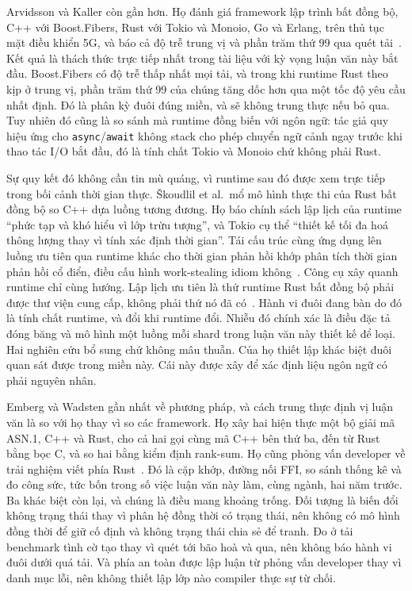 Arvidsson và Kaller còn gần hơn. Họ đánh giá framework lập trình bất đồng bộ, C++
với Boost.Fibers, Rust với Tokio và Monoio, Go và Erlang, trên thủ tục mặt điều khiển 5G,
và báo cả độ trễ trung vị và phần trăm thứ 99 qua quét
tải~\cite{arvidsson2025async}. Kết quả là thách thức trực tiếp nhất trong tài liệu với
kỳ vọng luận văn này bắt đầu. Boost.Fibers có độ trễ thấp nhất mọi tải,
và trong khi runtime Rust theo kịp ở trung vị, phần trăm thứ 99 của chúng tăng dốc hơn
qua một tốc độ yêu cầu nhất định. Đó là phân kỳ đuôi đúng miền, và sẽ
không trung thực nếu bỏ qua. Tuy nhiên đó cũng là so sánh mà runtime
đồng biến với ngôn ngữ: tác giả quy hiệu ứng cho
\texttt{async}/\texttt{await} không stack cho phép chuyển ngữ cảnh ngay trước khi thao tác I/O
bắt đầu, đó là tính chất Tokio và Monoio chứ không phải Rust.

Sự quy kết đó không cần tin mù quáng, vì runtime sau đó được
xem trực tiếp trong bối cảnh thời gian thực. \v{S}koudlil et al.\ mổ mô hình thực thi của
Rust bất đồng bộ so C++ dựa luồng tương đương. Họ báo chính sách lập lịch của
runtime ``phức tạp và khó hiểu vì lớp trừu tượng'', và Tokio cụ thể ``thiết kế tối đa hoá thông lượng thay vì
tính xác định thời gian''. Tái cấu trúc cùng ứng dụng lên luồng ưu tiên qua runtime
khác cho thời gian phản hồi khớp phân tích thời gian phản hồi cổ điển, điều cấu hình
work-stealing idiom không~\cite{skoudlil2025asyncrust}. Công cụ xây quanh
runtime chỉ cùng hướng. Lập lịch ưu tiên là thứ runtime Rust bất đồng bộ
phải được thư viện cung cấp, không phải thứ nó đã
có~\cite{zhuang2026flowprioritize}. Hành vi đuôi đang bàn do đó là
tính chất runtime, và đổi khi runtime đổi. Nhiễu đó chính xác là điều đặc tả đóng băng và mô hình một luồng mỗi shard trong luận văn này
thiết kế để loại. Hai nghiên cứu bổ sung chứ không mâu thuẫn.
Của họ thiết lập khác biệt đuôi quan sát được trong miền này. Cái này được
xây để xác định liệu ngôn ngữ có phải nguyên nhân.

Emberg và Wadsten gần nhất về phương pháp, và cách trung thực định vị
luận văn là so với họ thay vì so các framework. Họ xây hai
hiện thực một bộ giải mã ASN.1, C++ và Rust, cho cả hai gọi cùng mã C++ bên thứ ba,
đến từ Rust bằng bọc C, và so hai bằng kiểm định rank-sum. Họ
cũng phỏng vấn developer về trải nghiệm viết phía Rust~\cite{emberg2023asn1}.
Đó là cặp khớp, đường nối FFI, so sánh thống kê và đo công sức, tức
bốn trong số việc luận văn này làm, cùng ngành, hai năm trước. Ba khác biệt
còn lại, và chúng là điều mang khoảng trống. Đối tượng là biến đổi không trạng thái thay
vì phân hệ đồng thời có trạng thái, nên không có mô hình đồng thời để giữ cố định và không
trạng thái chia sẻ để tranh. Đo ở tải benchmark tình cờ tạo thay vì quét tới bão hoà và qua, nên không báo hành vi đuôi dưới quá tải. Và phía an toàn được lập luận từ phỏng vấn developer thay vì danh mục lỗi, nên không thiết lập lớp nào compiler thực sự từ chối.

